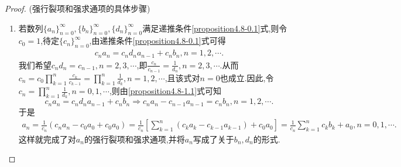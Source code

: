 \documentclass[../../main.tex]{subfiles}%
\begin{document}
\begin{proof}
(强行裂项和强求通项的具体步骤)
\begin{enumerate}[(1)]
\item 若数列\(\{ a_n \}_{n = 0}^{\infty}, \{ b_n \}_{n = 0}^{\infty}, \{ d_n \}_{n = 0}^{\infty}\)满足递推条件\eqref{proposition4.8-0.1}式,则令\(c_0 = 1\),待定\(\{ c_n \}_{n = 0}^{\infty}\),由递推条件\eqref{proposition4.8-0.1}式可得
\begin{align}\label{proposition4.8-1.1}
c_na_n = c_nd_na_{n - 1} + c_nb_n, n = 1, 2, \cdots. 
\end{align}
我们希望\(c_nd_n = c_{n - 1}, n = 2, 3, \cdots\),即\(\frac{c_n}{c_{n - 1}} = \frac{1}{d_n}, n = 2, 3, \cdots\).从而\(c_n = c_0\prod_{k = 1}^n{\frac{c_k}{c_{k - 1}}} = \prod_{k = 1}^n{\frac{1}{d_k}}, n = 1, 2, \cdots\),且该式对\(n = 0\)也成立.因此,令\(c_n = \prod_{k = 1}^n{\frac{1}{d_k}}, n = 0, 1, \cdots\),则由\eqref{proposition4.8-1.1}式可知
\[
c_na_n = c_nd_na_{n - 1} + c_nb_n \Rightarrow c_na_n - c_{n - 1}a_{n - 1} = c_nb_n, n = 1, 2, \cdots.
\]
于是
\begin{align*}
a_n = \frac{1}{c_n}(c_na_n - c_0a_0 + c_0a_0)
= \frac{1}{c_n}\left[ \sum_{k = 1}^n{(c_ka_k - c_{k - 1}a_{k - 1})} + c_0a_0 \right]
= \frac{1}{c_n}\sum_{k = 1}^n{c_kb_k} + a_0, n = 0, 1, \cdots.
\end{align*}
这样就完成了对\(a_n\)的强行裂项和强求通项,并将\(a_n\)写成了关于\(b_n, d_n\)的形式.


\end{enumerate}
\end{proof}
\end{document}
